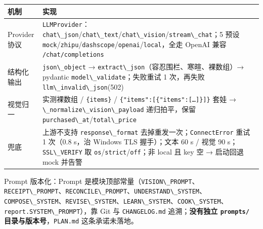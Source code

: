 {\def\LTcaptype{none} %
\begin{longtable}[]{@{}
  >{\raggedright\arraybackslash}p{}
  >{\raggedright\arraybackslash}p{}@{}}
\toprule\noalign{}
\begin{minipage}[b]{\linewidth}\raggedright
机制
\end{minipage} & \begin{minipage}[b]{\linewidth}\raggedright
实现
\end{minipage} \\
\midrule\noalign{}
\endhead
\bottomrule\noalign{}
\endlastfoot
Provider 协议 &
\passthrough{\lstinline!LLMProvider!}：\passthrough{\lstinline!chat\_json!}/\passthrough{\lstinline!chat\_text!}/\passthrough{\lstinline!chat\_vision!}/\passthrough{\lstinline!stream\_chat!}；5
预设
\passthrough{\lstinline!mock!}/\passthrough{\lstinline!zhipu!}/\passthrough{\lstinline!dashscope!}/\passthrough{\lstinline!openai!}/\passthrough{\lstinline!local!}，全走
OpenAI 兼容 \passthrough{\lstinline!/chat/completions!} \\
结构化输出 & \passthrough{\lstinline!json\_object!} →
\passthrough{\lstinline!extract\_json!}（容忍围栏、寒暄、裸数组）→
pydantic \passthrough{\lstinline!model\_validate!}；失败重试 1
次，再失败 \passthrough{\lstinline!llm\_invalid\_json!}(502) \\
视觉归一 & 实测裸数组 / \passthrough{\lstinline!\{items\}!} /
\passthrough{\lstinline!\{"items":[\{"items":[…]\}]\}!} 套娃 →
\passthrough{\lstinline!\_normalize\_vision\_payload!} 递归拍平，保留
\passthrough{\lstinline!purchased\_at!}/\passthrough{\lstinline!total\_price!} \\
兜底 & 上游不支持 \passthrough{\lstinline!response\_format!}
去掉重发一次；\passthrough{\lstinline!ConnectError!} 重试 1 次（0.8
s，治 Windows TLS 握手）；文本 60 s / 视觉 90
s；\passthrough{\lstinline!SSL\_VERIFY!} 取
\passthrough{\lstinline!os!}/\passthrough{\lstinline!strict!}/\passthrough{\lstinline!off!}；非
local 且 key 空 → 启动回退 mock 并告警 \\
\end{longtable}
}

Prompt 版本化：Prompt
是模块顶部常量（\passthrough{\lstinline!VISION\_PROMPT!}、\passthrough{\lstinline!RECEIPT\_PROMPT!}、\passthrough{\lstinline!RECONCILE\_PROMPT!}、\passthrough{\lstinline!UNDERSTAND\_SYSTEM!}、\passthrough{\lstinline!COMPOSE\_SYSTEM!}、\passthrough{\lstinline!REVISE\_SYSTEM!}、\passthrough{\lstinline!LEARN\_SYSTEM!}、\passthrough{\lstinline!COOK\_SYSTEM!}、\passthrough{\lstinline!report.SYSTEM\_PROMPT!}），靠
Git 与 \passthrough{\lstinline!CHANGELOG.md!} 追溯；\textbf{没有独立
\passthrough{\lstinline!prompts/!}
目录与版本号}，\passthrough{\lstinline!PLAN.md!} 这条承诺未落地。

